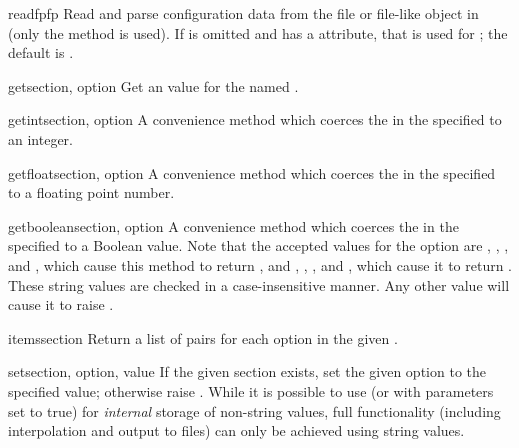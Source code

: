 \begin{methoddesc}{readfp}{fp}
Read and parse configuration data from the file or file-like object in
 (only the  method is used).  If
 is omitted and  has a  attribute,
that is used for ; the default is .
\end{methoddesc}

\begin{methoddesc}{get}{section, option}
Get an  value for the named .
\end{methoddesc}

\begin{methoddesc}{getint}{section, option}
A convenience method which coerces the  in the specified
 to an integer.
\end{methoddesc}

\begin{methoddesc}{getfloat}{section, option}
A convenience method which coerces the  in the specified
 to a floating point number.
\end{methoddesc}

\begin{methoddesc}{getboolean}{section, option}
A convenience method which coerces the  in the specified
 to a Boolean value.  Note that the accepted values
for the option are , , , and ,
which cause this method to return , and , ,
, and , which cause it to return .  These
string values are checked in a case-insensitive manner.  Any other value will
cause it to raise .
\end{methoddesc}

\begin{methoddesc}{items}{section}
Return a list of  pairs for each
option in the given .
\end{methoddesc}

\begin{methoddesc}{set}{section, option, value}
If the given section exists, set the given option to the specified
value; otherwise raise .  While it is
possible to use  (or  with
 parameters set to true) for \emph{internal} storage of
non-string values, full functionality (including interpolation and
output to files) can only be achieved using string values.
\end{methoddesc}

